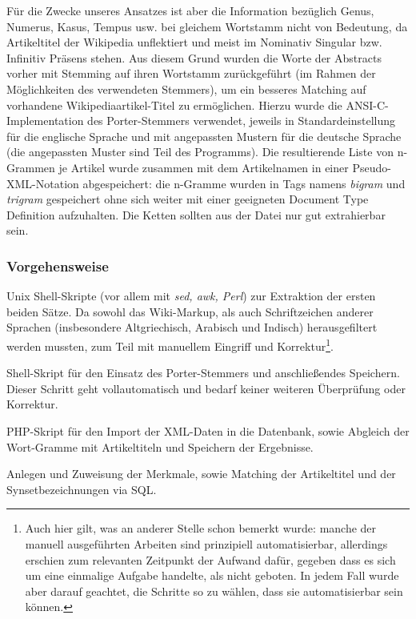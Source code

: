 \documentclass[pagesize,DIV=calc,12pt,draft]{scrreprt}
\begin{document}
Für die Zwecke unseres Ansatzes ist aber die Information bezüglich Genus, Numerus, Kasus, Tempus usw. bei gleichem Wortstamm nicht von Bedeutung, da Artikeltitel der Wikipedia unflektiert und meist im Nominativ Singular bzw. Infinitiv Präsens stehen.
Aus diesem Grund wurden die Worte der Abstracts vorher mit Stemming auf ihren Wortstamm zurückgeführt (im Rahmen der Möglichkeiten des verwendeten Stemmers), um ein besseres Matching auf vorhandene Wikipediaartikel-Titel zu ermöglichen.
Hierzu wurde die ANSI-C-Implementation des Porter-Stemmers verwendet, jeweils in Standardeinstellung für die englische Sprache und mit angepassten Mustern für die deutsche Sprache (die angepassten Muster sind Teil des Programms). 
Die resultierende Liste von n-Grammen je Artikel wurde zusammen mit dem Artikelnamen in einer Pseudo-XML-Notation abgespeichert: die n-Gramme wurden in Tags namens \textit{bigram} und \textit{trigram} gespeichert ohne sich weiter mit einer geeigneten Document Type Definition aufzuhalten. 
Die Ketten sollten aus der Datei nur gut extrahierbar sein. 

\subsubsection{Vorgehensweise}

\begin{inparaenum}
\item Unix Shell-Skripte (vor allem mit \emph{sed, awk, Perl}) zur Extraktion der ersten beiden Sätze. 
    Da sowohl das Wiki-Markup, als auch Schriftzeichen anderer Sprachen (insbesondere Altgriechisch, Arabisch und Indisch) herausgefiltert werden mussten, zum Teil mit manuellem Eingriff und Korrektur\footnote{Auch hier gilt, was an anderer Stelle schon bemerkt wurde: manche der manuell ausgeführten Arbeiten sind prinzipiell automatisierbar, allerdings erschien zum relevanten Zeitpunkt der Aufwand dafür, gegeben dass es sich um eine einmalige Aufgabe handelte, als nicht geboten. 
In jedem Fall wurde aber darauf geachtet, die Schritte so zu wählen, dass sie automatisierbar sein können.}.

\item Shell-Skript für den Einsatz des Porter-Stemmers und anschließendes Speichern. 
Dieser Schritt geht vollautomatisch und bedarf keiner weiteren Überprüfung oder Korrektur.
\item PHP-Skript für den Import der XML-Daten in die Datenbank, sowie Abgleich der Wort-Gramme mit Artikeltiteln und Speichern der Ergebnisse.

\item Anlegen und Zuweisung der Merkmale, sowie Matching der Artikeltitel und der Synsetbezeichnungen via SQL. 
\end{inparaenum}
\end{document}
